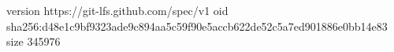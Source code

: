 version https://git-lfs.github.com/spec/v1
oid sha256:d48e1c9bf9323ade9c894aa5c59f90e5accb622de52c5a7ed901886e0bb14e83
size 345976
